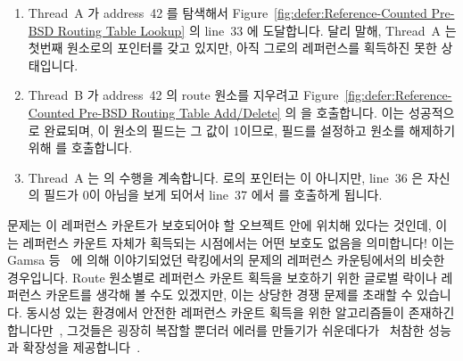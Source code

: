 \begin{enumerate}
\item	Thread~A 가 address~42 를 탐색해서
	Figure~\ref{fig:defer:Reference-Counted Pre-BSD Routing Table Lookup}
	 의 line~33 에 도달합니다.
	달리 말해, Thread~A 는 첫번째 원소로의 포인터를 갖고 있지만, 아직
	그로의 레퍼런스를 획득하진 못한 상태입니다.
\item	Thread~B 가 address~42 의 route 원소를 지우려고
	Figure~\ref{fig:defer:Reference-Counted Pre-BSD Routing Table Add/Delete}
	의  을 호출합니다.
	이는 성공적으로 완료되며, 이 원소의  필드는 그 값이
	1이므로,  필드를 설정하고 원소를 해제하기 위해
	 를 호출합니다.
\item	Thread~A 는  의 수행을 계속합니다.
	 로의 포인터는  이 아니지만, line~36 은 자신의
	 필드가 0이 아님을 보게 되어서 line~37 에서 
	를 호출하게 됩니다.

\end{enumerate}

문제는 이 레퍼런스 카운트가 보호되어야 할 오브젝트 안에 위치해 있다는 것인데,
이는 레퍼런스 카운트 자체가 획득되는 시점에서는 어떤 보호도 없음을 의미합니다!
이는 Gamsa 등~\cite{Gamsa99} 에 의해 이야기되었던 락킹에서의 문제의 레퍼런스
카운팅에서의 비슷한 경우입니다.
Route 원소별로 레퍼런스 카운트 획득을 보호하기 위한 글로벌 락이나 레퍼런스
카운트를 생각해 볼 수도 있겠지만, 이는 상당한 경쟁 문제를 초래할 수 있습니다.
동시성 있는 환경에서 안전한 레퍼런스 카운트 획득을 위한 알고리즘들이 존재하긴
합니다만~\cite{Valois95a}, 그것들은 굉장히 복잡할 뿐더러 에러를 만들기가
쉬운데다가~\cite{MagedMichael95a} 처참한 성능과 확장성을
제공합니다~\cite{ThomasEHart2007a}.

